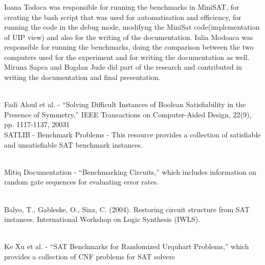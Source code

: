 \documentclass[runningheads]{llncs}
\begin{document}
\begin{credits}
\subsubsection{\ackname} Ioana Todoca was responsible for running the benchmarks in MiniSAT, for creating the bash script that was used for automatisation and efficiency, for running the code in the debug mode, modifyng the MiniSat code(implementation of UIP view) and also for the writing of the documentation. Iulia Modoaca was responsible for running the benchmarks, doing the comparison between the two computers used for the experiment and for writing the documentation as well. Miruna Sapca and Bogdan Jude did part of the research and contributed in writing the documentation and final presentation.

\end{credits}
%
%
%
% 
% 
%
\begin{thebibliography}{8}
\bibitem[1]
\\Fadi Aloul et al. - “Solving Difficult Instances of Boolean Satisfiability in the Presence of Symmetry,” IEEE Transactions on Computer-Aided Design, 22(9), pp. 1117-1137, 20031
\bibitem[2]
\\SATLIB - Benchmark Problems - This resource provides a collection of satisfiable and unsatisfiable SAT benchmark instances.

\bibitem[3]
\\Mitiq Documentation - “Benchmarking Circuits,” which includes information on random gate sequences for evaluating error rates.

\bibitem[4]
\\Balyo, T., Gableske, O.,  Sinz, C. (2004). Restoring circuit structure from SAT instances. International Workshop on Logic Synthesis (IWLS). 

\bibitem[5]
\\Ke Xu et al. - “SAT Benchmarks for Randomized Urquhart Problems,” which provides a collection of CNF problems for SAT solvers


\end{thebibliography}
\end{document}
